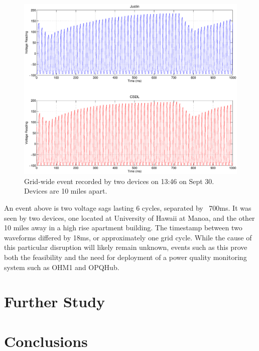\begin{figure}[h!]
\centering
\includegraphics[width=\textwidth]{img/gridwide.eps}
\caption{Grid-wide event recorded by two devices on 13:46 on Sept 30. Devices are 10 miles apart.}
\label{fig:grid}
\end{figure} 

An event above is two voltage sags lasting 6 cycles, separated by ~700ms. It was seen by two devices, one located at University of Hawaii at Manoa, and the other 10 miles away in a high rise
apartment building. The timestamp between two waveforms differed by 18ms, or approximately one grid cycle. While the cause of this particular disruption will likely remain unknown, events 
such as this prove both the feasibility and the need for deployment of a power quality monitoring system such as OHM1 and OPQHub.

\chapter{Further Study}\label{chap:further}
	
\chapter{Conclusions}
